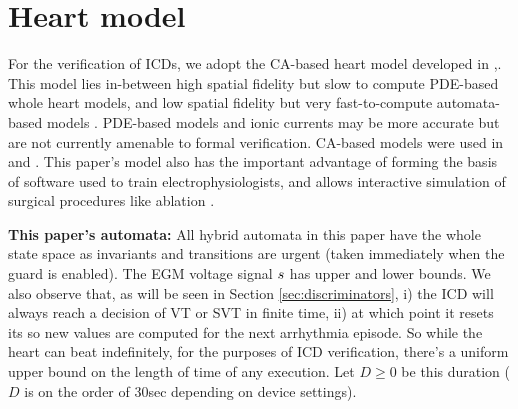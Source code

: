\section{Heart model}
\label{sec:heartcellularautomata}
For the verification of \acp{ICD},
we adopt the \acf{CA}-based heart model developed in \cite{Spector11_Emergence},\cite{CorreaEtAl11_EGMFractionation}.
This model lies in-between high spatial fidelity but slow to compute PDE-based whole heart models, and low spatial fidelity but very fast-to-compute automata-based models \cite{TECS}.
PDE-based models and ionic currents \cite{Islam1MGSG14_CompositionalityCells} may be more accurate but are not currently amenable to formal verification.
\ac{CA}-based models were used in \cite{BartocciCBESG09_HIOAmodeling} and \cite{Chen14_Quantitative}.
This paper's model also has the important advantage of forming the basis of software used to train electrophysiologists, and allows interactive simulation of surgical procedures like ablation \cite{visibleep}.
%

\textbf{This paper's automata:} All hybrid automata in this paper have the whole state space as invariants and transitions are urgent (taken immediately when the guard is enabled).
The \ac{EGM} voltage signal $s$ has upper and lower bounds.
We also observe that, as will be seen in Section \ref{sec:discriminators},
i) the \ac{ICD} will always reach a decision of VT or SVT in finite time, 
ii) at which point it resets its  so new values are computed for the next arrhythmia episode.
So while the heart can beat indefinitely, for the purposes of \ac{ICD} verification, 
there's a uniform upper bound on the length of time of any execution.
Let $D \geq 0$ be this duration ($D$ is on the order of 30sec depending on device settings).

